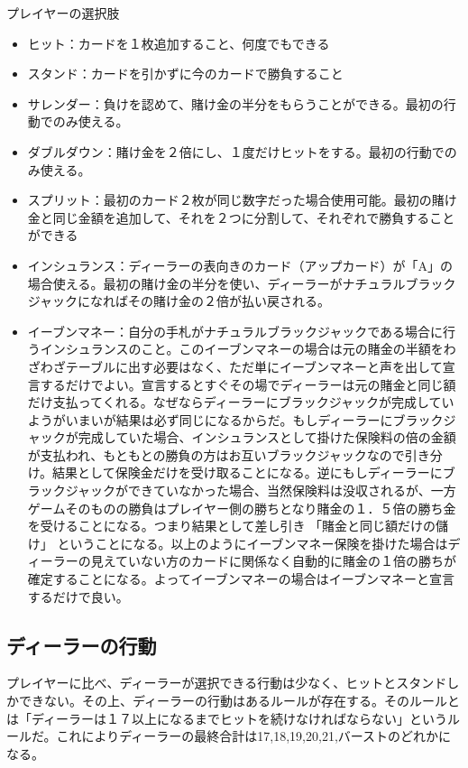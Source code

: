 プレイヤーの選択肢
\begin{itemize}
\item ヒット：カードを１枚追加すること、何度でもできる
\item スタンド：カードを引かずに今のカードで勝負すること
\item サレンダー：負けを認めて、賭け金の半分をもらうことができる。最初の行動でのみ使える。
\item ダブルダウン：賭け金を２倍にし、１度だけヒットをする。最初の行動でのみ使える。
\item スプリット：最初のカード２枚が同じ数字だった場合使用可能。最初の賭け金と同じ金額を追加して、それを２つに分割して、それぞれで勝負することができる
\item インシュランス：ディーラーの表向きのカード（アップカード）が「A」の場合使える。最初の賭け金の半分を使い、ディーラーがナチュラルブラックジャックになればその賭け金の２倍が払い戻される。
\item イーブンマネー：自分の手札がナチュラルブラックジャックである場合に行うインシュランスのこと。このイーブンマネーの場合は元の賭金の半額をわざわざテーブルに出す必要はなく、ただ単にイーブンマネーと声を出して宣言するだけでよい。宣言するとすぐその場でディーラーは元の賭金と同じ額だけ支払ってくれる。なぜならディーラーにブラックジャックが完成していようがいまいが結果は必ず同じになるからだ。もしディーラーにブラックジャックが完成していた場合、インシュランスとして掛けた保険料の倍の金額が支払われ、もともとの勝負の方はお互いブラックジャックなので引き分け。結果として保険金だけを受け取ることになる。逆にもしディーラーにブラックジャックができていなかった場合、当然保険料は没収されるが、一方ゲームそのものの勝負はプレイヤー側の勝ちとなり賭金の１．５倍の勝ち金を受けることになる。つまり結果として差し引き 「賭金と同じ額だけの儲け」 ということになる。以上のようにイーブンマネー保険を掛けた場合はディーラーの見えていない方のカードに関係なく自動的に賭金の１倍の勝ちが確定することになる。よってイーブンマネーの場合はイーブンマネーと宣言するだけで良い。
\end{itemize}

\subsection{ディーラーの行動}
プレイヤーに比べ、ディーラーが選択できる行動は少なく、ヒットとスタンドしかできない。その上、ディーラーの行動はあるルールが存在する。そのルールとは「ディーラーは１７以上になるまでヒットを続けなければならない」というルールだ。これによりディーラーの最終合計は17,18,19,20,21,バーストのどれかになる。

